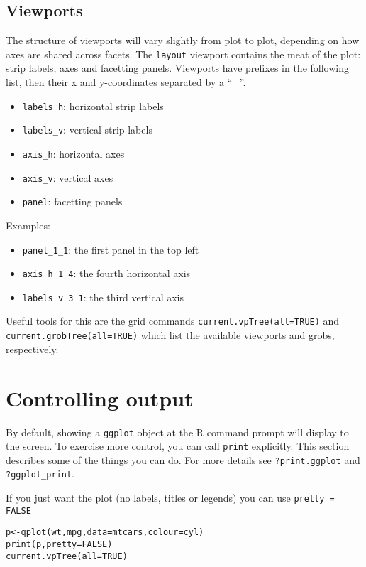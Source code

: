 \subsection{Viewports}\label{sub:viewports}

The structure of viewports will vary slightly from plot to plot, depending on how axes are shared across facets.  The {\tt layout} viewport contains the meat of the plot: strip labels, axes and facetting panels.  Viewports have prefixes in the following list, then their x and y-coordinates separated by a ``\_''.

\begin{itemize}
  \item {\tt labels\_h}: horizontal strip labels
  \item {\tt labels\_v}: vertical strip labels
  \item {\tt axis\_h}: horizontal axes
  \item {\tt axis\_v}: vertical axes
  \item {\tt panel}: facetting panels
\end{itemize}

Examples:

\begin{itemize}
  \item {\tt panel\_1\_1}: the first panel in the top left
  \item {\tt axis\_h\_1\_4}: the fourth horizontal axis
  \item {\tt labels\_v\_3\_1}: the third vertical axis
\end{itemize}

Useful tools for this are the grid commands {\tt current.vpTree(all=TRUE)} and {\tt current.grobTree(all=TRUE)} which list the available viewports and grobs, respectively.  

\section{Controlling output}\label{sec:controlling_output}

By default, showing a {\tt ggplot} object at the R command prompt will display to the screen.  To exercise more control, you can call {\tt print} explicitly.  This section describes some of the things you can do.  For more details see {\tt ?print.ggplot} and {\tt ?ggplot\_print}.

If you just want the plot (no labels, titles or legends) you can use {\tt pretty = FALSE}

\begin{alltt}
p <- qplot(wt, mpg, data=mtcars, colour=cyl)
print(p, pretty = FALSE)
current.vpTree(all=TRUE)
\end{alltt}

